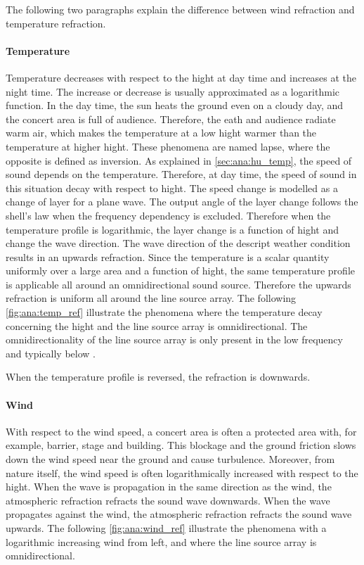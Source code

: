 The following two paragraphs explain the difference between wind refraction and temperature refraction.

\paragraph{Temperature} Temperature decreases with respect to the hight at day time and increases at the night time. The increase or decrease is usually approximated as a logarithmic function. In the day time, the sun heats the ground even on a cloudy day, and the concert area is full of audience. Therefore, the eath and audience radiate warm air, which makes the temperature at a low hight warmer than the temperature at higher hight. These phenomena are named lapse, where the opposite is defined as inversion. As explained in \autoref{sec:ana:hu_temp}, the speed of sound depends on the temperature. Therefore, at day time, the speed of sound in this situation decay with respect to hight. The speed change is modelled as a change of layer for a plane wave. The output angle of the layer change follows the shell's law when the frequency dependency is excluded. Therefore when the temperature profile is logarithmic, the layer change is a function of hight and change the wave direction. The wave direction of the descript weather condition results in an upwards refraction. Since the temperature is a scalar quantity uniformly over a large area and a function of hight, the same temperature profile is applicable all around an omnidirectional sound source. Therefore the upwards refraction is uniform all around the line source array. The following \autoref{fig:ana:temp_ref} illustrate the phenomena where the temperature decay concerning the hight and the line source array is omnidirectional. The omnidirectionality of the line source array is only present in the low frequency and typically below .


When the temperature profile is reversed, the refraction is downwards. 
 

\paragraph{Wind} With respect to the wind speed, a concert area is often a protected area with, for example, barrier, stage and building. This blockage and the ground friction slows down the wind speed near the ground and cause turbulence. Moreover, from nature itself, the wind speed is often logarithmically increased with respect to the hight. When the wave is propagation in the same direction as the wind, the atmospheric refraction refracts the sound wave downwards. When the wave propagates against the wind, the atmospheric refraction refracts the sound wave upwards. The following \autoref{fig:ana:wind_ref}  illustrate the phenomena with a logarithmic increasing wind from left, and where the line source array is omnidirectional.


